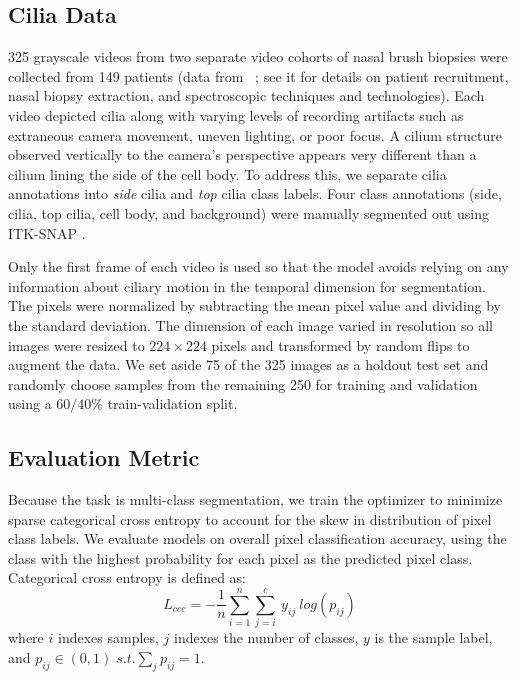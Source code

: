 \documentclass{llncs}
\begin{document}
\subsection{Cilia Data}
325 grayscale videos from two separate video cohorts of nasal brush biopsies were collected from 149 patients (data from ~\cite{QuinnSTM}; see it for details on patient recruitment, nasal biopsy extraction, and spectroscopic techniques and technologies). Each video depicted cilia along with varying levels of recording artifacts such as extraneous camera movement, uneven lighting, or poor focus. A cilium structure observed vertically to the camera's perspective appears very different than a cilium lining the side of the cell body. To address this, we separate cilia annotations into \textit{side} cilia and \textit{top} cilia class labels. Four class annotations (side, cilia, top cilia, cell body, and background) were manually segmented out using ITK-SNAP \cite{ITK-SNAP}.
\par
Only the first frame of each video is used so that the model avoids relying on any information about ciliary motion in the temporal dimension for segmentation. The pixels were normalized by subtracting the mean pixel value and dividing by the standard deviation. The dimension of each image varied in resolution so all images were resized to $224 \times 224$ pixels and transformed by random flips to augment the data. We set aside 75 of the 325 images as a holdout test set and randomly choose samples from the remaining 250 for training and validation using a $60/40$\% train-validation split.

\subsection{Evaluation Metric}
Because the task is multi-class segmentation, we train the optimizer to minimize sparse categorical cross entropy to account for the skew in distribution of pixel class labels. We evaluate models on overall pixel classification accuracy, using the class with the highest probability for each pixel as the predicted pixel class. Categorical cross entropy is defined as:
\begin{equation}
L_{cce} = -\frac{1}{n}\sum^n_{i=1}\sum^c_{j=i}\ y_{ij}\ log\left(p_{ij}\right)
\end{equation}
where $i$ indexes samples, $j$ indexes the number of classes, $y$ is the sample label, and $p_{ij} \in (0, 1) \; s.t. \sum_j p_{ij} = 1$.

\end{document}
